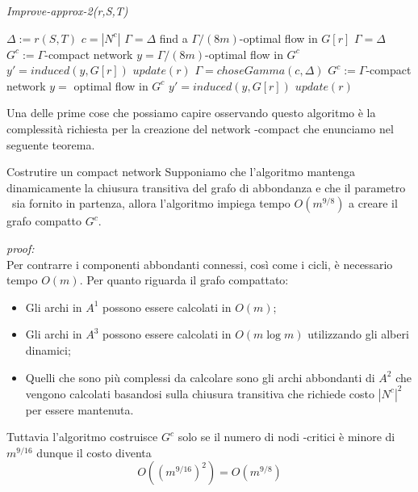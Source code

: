\begin{algorithm}
\caption{\textit{Improve-approx-2(r,S,T)}}
\label{imp2}
\begin{algorithmic}[1]
\State $\Delta := r(S,T)$
\State $c = |N^c|$
    \State $\Gamma = \Delta$
    \State find a $\Gamma/(8m)$-optimal flow in $G[r]$
    \State $\Gamma = \Delta$
    \State $G^c:= \Gamma$-compact network
    \State $y=\Gamma/(8m)$-optimal flow in $G^c$
    \State $y' = induced(y, G[r])$
    \State $update(r)$
    $\Gamma = choseGamma(c, \Delta)$
    \State $G^c:= \Gamma$-compact network
    \State $y=$ optimal flow in $G^c$
    \State $y' = induced(y, G[r])$
    \State $update(r)$
\EndIf
\end{algorithmic}
\end{algorithm}
Una delle prime cose che possiamo capire osservando questo algoritmo è la complessità richiesta per la creazione del network \gmm-compact che enunciamo nel seguente teorema.
\begin{theorem}[label = tgcomp]{Costrutire un compact network}{}
    Supponiamo che l'algoritmo mantenga dinamicamente la chiusura transitiva del grafo di abbondanza e 
    che il parametro \gmm\ sia fornito in partenza, allora
    l'algoritmo impiega tempo $O(m^{9/8})$ a creare il grafo compatto $G^c$.
\end{theorem}
\textit{proof:}\\
    Per contrarre i componenti abbondanti connessi, così come i cicli, è necessario tempo $O(m)$.
    Per quanto riguarda il grafo compattato: 
    \begin{itemize}
        \item Gli archi in $A^1$ possono essere calcolati in $O(m)$; 
        \item Gli archi in $A^3$ possono essere calcolati in $O(m\log m)$ utilizzando gli alberi dinamici;
        \item Quelli che sono più complessi da calcolare sono gli archi abbondanti di $A^2$ che vengono calcolati basandosi sulla chiusura transitiva che richiede costo ${|N^c|}^2$ per essere mantenuta.
    \end{itemize}
    Tuttavia l'algoritmo costruisce $G^c$ solo se il numero di nodi \gmm-critici è minore di $m^{9/16}$ dunque il costo diventa
    \[O((m^{9/16})^2) = O(m^{9/8})\]


